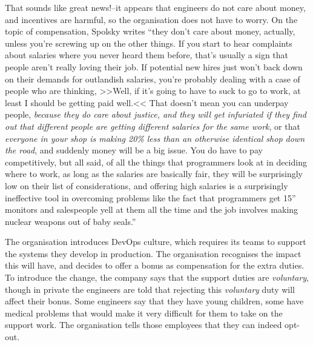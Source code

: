 That sounds like great news!--it appears that engineers do not care about money, and incentives are harmful, so the organisation does not have to worry. On the topic of compensation, Spolsky\cite{field-guide-to-developers} writes ``they don't care about money, actually, unless you're screwing up on the other things. If you start to hear complaints about salaries where you never heard them before, that's usually a sign that people aren't really loving their job. If potential new hires just won't back down on their demands for outlandish salaries, you're probably dealing with a case of people who are thinking, >>Well, if it's going to have to suck to go to work, at least I should be getting paid well.<< That doesn't mean you can underpay people, \emph{because they do care about justice, and they will get infuriated if they find out that different people are getting different salaries for the same work}, or that \emph{everyone in your shop is making 20\% less than an otherwise identical shop down the road}, and suddenly money will be a big issue. You do have to pay competitively, but all said, of all the things that programmers look at in deciding where to work, as long as the salaries are basically fair, they will be surprisingly low on their list of considerations, and offering high salaries is a surprisingly ineffective tool in overcoming problems like the fact that programmers get 15'' monitors and salespeople yell at them all the time and the job involves making nuclear weapons out of baby seals.''

\begin{example}
The organisation introduces DevOps culture, which requires its teams to support the systems they develop in production. The organisation recognises the impact this will have, and decides to offer a bonus as compensation for the extra duties. To introduce the change, the company says that the support duties are \emph{voluntary}, though in private the engineers are told that rejecting this \emph{voluntary} duty will affect their bonus. Some engineers say that they have young children, some have medical problems that would make it very difficult for them to take on the support work. The organisation tells those employees that they can indeed opt-out. %
\end{example}

